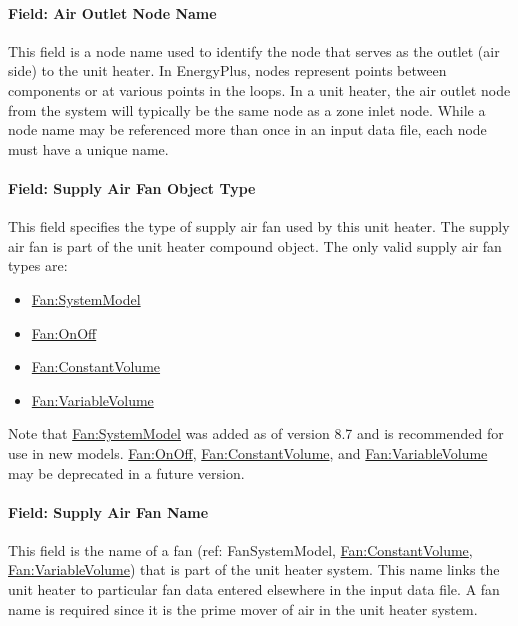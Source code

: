 \paragraph{Field: Air Outlet Node Name}\label{field-air-outlet-node-name-2-003}

This field is a node name used to identify the node that serves as the outlet (air side) to the unit heater. In EnergyPlus, nodes represent points between components or at various points in the loops. In a unit heater, the air outlet node from the system will typically be the same node as a zone inlet node. While a node name may be referenced more than once in an input data file, each node must have a unique name.

\paragraph{Field: Supply Air Fan Object Type}\label{field-supply-air-fan-object-type-2-000}

This field specifies the type of supply air fan used by this unit heater. The supply air fan is part of the unit heater compound object. The only valid supply air fan types are:

\begin{itemize}
\item
  \hyperref[fansystemmodel]{Fan:SystemModel}
\item
  \hyperref[fanonoff]{Fan:OnOff}
\item
  \hyperref[fanconstantvolume]{Fan:ConstantVolume}
\item
  \hyperref[fanvariablevolume]{Fan:VariableVolume}
\end{itemize}

Note that \hyperref[fansystemmodel]{Fan:SystemModel} was added as of version 8.7 and is recommended for use in new models.  \hyperref[fanonoff]{Fan:OnOff}, \hyperref[fanconstantvolume]{Fan:ConstantVolume}, and \hyperref[fanvariablevolume]{Fan:VariableVolume} may be deprecated in a future version.

\paragraph{Field: Supply Air Fan Name}\label{field-supply-air-fan-name-2-000}

This field is the name of a fan (ref: FanSystemModel, \hyperref[fanconstantvolume]{Fan:ConstantVolume}, \hyperref[fanvariablevolume]{Fan:VariableVolume}) that is part of the unit heater system. This name links the unit heater to particular fan data entered elsewhere in the input data file. A fan name is required since it is the prime mover of air in the unit heater system.

